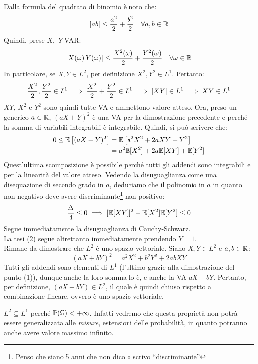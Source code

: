 \smallskip
\begin{dimo}
  Dalla formula del quadrato di binomio è noto che:
  $$ \lvert ab\rvert \le \frac{a^2}{2} + \frac{b^2}{2} \quad \forall a,b \in \mathbb R$$
  Quindi, prese $X,$ $Y$ VAR:
  $$\lvert X(\omega) \, Y(\omega)\rvert \le
  \frac{X^2(\omega)}{2}+\frac{Y^2(\omega)}{2} \quad \forall \omega \in \mathbb R$$
  In particolare, se $X,Y \in L^2$, per definizione $X^2,Y^2 \in L^1$. Pertanto:
  $$\frac{X^2}{2}, \frac{Y^2}{2} \in L^1
  \implies \frac{X^2}{2} + \frac{Y^2}{2} \in L^1 \implies \lvert XY\rvert \in L^1
  \implies XY \in L^1$$
  $XY$, $X^2$ e $Y^2$ sono quindi tutte VA e ammettono valore atteso.
  Ora, preso un generico $a \in \mathbb R$, $(aX+Y)^2$ è una VA per la dimostrazione precedente e perché la somma di variabili integrabili è integrabile. Quindi, si può scrivere che:
  \begin{align*}
    0 \le \mathbb E\left[(aX+Y)^2\right]
    &=\mathbb E\left[a^2 X^2 + 2aXY + Y^2\right]\\
    &= a^2 \mathbb E[X^2] + 2a \mathbb E[XY] + \mathbb E[Y^2]
  \end{align*}
  Quest'ultima scomposizione è possibile perché tutti gli addendi sono integrabili e per la linearità del valore atteso. Vedendo la disuguaglianza come una disequazione di secondo grado in $a$, deduciamo che il polinomio in $a$ in quanto non negativo deve avere discriminante\footnote{Penso che siano 5 anni che non dico o scrivo ``discriminante''} non positivo:
  $$\frac{\Delta}{4} \le 0 \implies
  [\mathbb E[XY]]^2 - \mathbb E[X^2]\mathbb E[Y^2] \le 0$$
  Segue immediatamente la disuguaglianza di Cauchy-Schwarz. \\
  La tesi (2) segue altrettanto immediatamente prendendo $Y=1$. \\
  Rimane da dimostrare che $L^2$ è uno spazio vettoriale. Siano $X,Y \in L^2$ e $a,b \in \mathbb R$:
  $$(aX + bY)^2 = a^2 X^2 + b^2 Y^2 + 2abXY$$
  Tutti gli addendi sono elementi di $L^1$ (l'ultimo grazie alla dimostrazione del punto (1)),
  dunque anche la loro somma lo è, e anche la VA $aX+bY$. Pertanto, per definizione, $(aX+bY) \in L^2$,
  il quale è quindi chiuso rispetto a combinazione lineare, ovvero è uno spazio vettoriale. \qedhere
\end{dimo}

\medskip
\begin{nb}
  $L^2 \subseteq L^1$ perché $\mathbb P(\Omega) < +\infty$.
  Infatti vedremo che questa proprietà non potrà essere
  generalizzata alle \emph{misure}, estensioni delle probabilità, in quanto potranno anche avere valore massimo infinito.
\end{nb}

